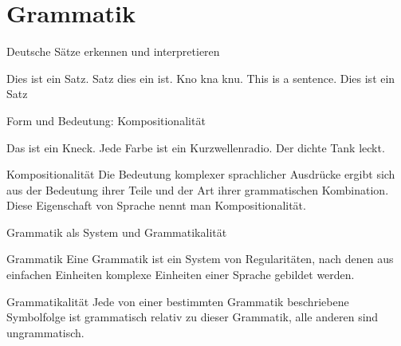 \section{Grammatik}

\begin{frame}
  {Deutsche Sätze erkennen und interpretieren}
  \pause
  \begin{exe}
    \ex Dies ist ein Satz.
  \pause
    \ex Satz dies ein ist.
  \pause
    \ex Kno kna knu.
  \pause
    \ex This is a sentence.
  \pause
    \vspace{\baselineskip}
    \ex Dies ist ein Satz
  \end{exe}
\end{frame}


\begin{frame}
  {Form und Bedeutung: Kompositionalität}
  \begin{exe}
    \ex Das ist ein Kneck.
    \pause
    \vspace{\baselineskip}
  \ex Jede Farbe ist ein Kurzwellenradio.
  \ex Der dichte Tank leckt.
\end{exe}
    \vspace{\baselineskip}
  \pause

  \Large\begin{block}{Kompositionalität}
    Die Bedeutung komplexer sprachlicher Ausdrücke ergibt sich aus der Bedeutung ihrer Teile und der Art ihrer grammatischen Kombination. 
    Diese Eigenschaft von Sprache nennt man Kompositionalität.
  \end{block}
\end{frame}

\begin{frame}
  {Grammatik als System und Grammatikalität}
  \pause

  \Large\begin{block}{Grammatik}
    Eine Grammatik ist ein \alert{System von Regularitäten}, nach denen aus einfachen Einheiten komplexe Einheiten einer Sprache gebildet werden.
  \end{block}
  \vspace{\baselineskip}

  \pause

  \begin{block}{Grammatikalität}
    Jede von einer bestimmten Grammatik beschriebene Symbolfolge ist \alert{grammatisch} relativ zu dieser Grammatik, alle anderen sind \alert{ungrammatisch}.
  \end{block}
\end{frame}

